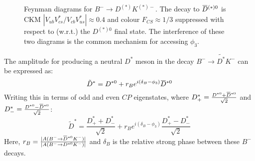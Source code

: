 \documentclass[oneside,12pt]{article}
\newcommand{\overbar}[1]{\mkern 1.5mu\overline{\mkern-1.5mu#1\mkern-1.5mu}\mkern
1.5mu}
\begin{document}
\begin{figure}[htp]
\vspace*{-7mm}
\centering
{}
	\caption{{Feynman diagrams for ${B}^{-}\rightarrow{D}^{(*)}{K}^{(*)-}$}.
The decay to $\overbar{{D}}^{(*)0}$ is CKM
$|V_{ub}V^{*}_{cs}/V_{cb}V^{*}_{us}|\approx0.4$ and colour ${F}_{CS}\approx1/3$
suppressed with respect to (w.r.t.) the ${D}^{(*)0}$ final state. The
interference of these two diagrams is the common mechanism for accessing
$\phi_3$.}
	\label{fig:B2DstarKstar}
	\vspace{-10pt}
\end{figure}

\noindent The amplitude for producing a neutral ${D}^*$ meson in the decay $B^-\rightarrow \tilde{D^*}K^-$ can be expressed as:
  \begin{equation}
    \tilde{D}^*=D^{*0}+r_Be^{i(\delta_B-\phi_3)}\overbar{D}^{*0}
    \label{eq:DstTilde}
  \end{equation}
\noindent Writing this in terms of odd and even $CP$ eigenstates, where
$D^{*}_{+}=\frac{D^{*0}+\overbar{D}^{*0}}{\sqrt{2}}$ and
$D^{*}_{-}=\frac{D^{*0}-\overbar{D}^{*0}}{\sqrt{2}}$:
  \begin{equation}
    \tilde{D}^*=\frac{D^{*}_{+}+D^{*}_{-}}{\sqrt{2}}+r_Be^{i(\delta_B-\phi_3)}\frac{D^{*}_{+}-D^{*}_{-}}{\sqrt{2}}
    \label{eq:DstTildeCP}
  \end{equation}
\noindent Here, $r_B=\frac{|A(B^{-}\rightarrow
\overbar{D}^{*0}K^-)|}{|A(B^{-}\rightarrow {D}^{*0}K^-)|}$ and $\delta_{B}$ is
the relative strong phase between these $B^-$ decays.
 
\end{document}
